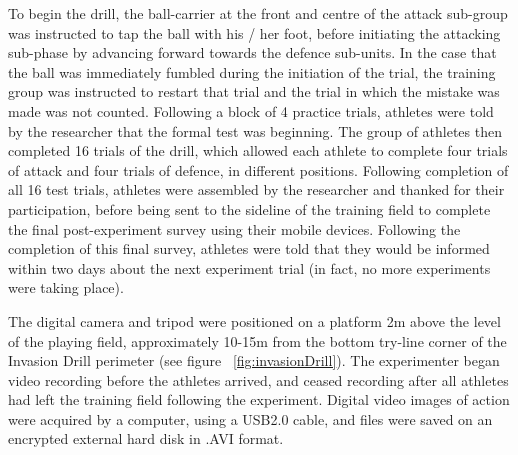 To begin the drill, the ball-carrier at the front and centre of the attack sub-group was instructed to tap the ball with his / her foot, before initiating the attacking sub-phase by advancing forward towards the defence sub-units.  In the case that the ball was immediately fumbled during the initiation of the trial, the training group was instructed to restart that trial and the trial in which the mistake was made was not counted.  Following a block of 4 practice trials, athletes were told by the researcher that the formal test was beginning.  The group of athletes then completed 16 trials of the drill, which allowed each athlete to complete four trials of attack and four trials of defence, in different positions.  Following completion of all 16 test trials, athletes were assembled by the researcher and thanked for their participation, before being sent to the sideline of the training field to complete the final post-experiment survey using their mobile devices.  Following the completion of this final survey, athletes were told that they would be informed within two days about the next experiment trial (in fact, no more experiments were taking place).

The digital camera and tripod were positioned on a platform 2m above the level of the playing field, approximately 10-15m from the bottom try-line corner of the Invasion Drill perimeter (see figure ~\ref{fig:invasionDrill}).  The experimenter began video recording before the athletes arrived, and ceased recording after all athletes had left the training field following the experiment.  Digital video images of action were acquired by a computer, using a USB2.0 cable, and files were saved on an encrypted external hard disk in .AVI format.



